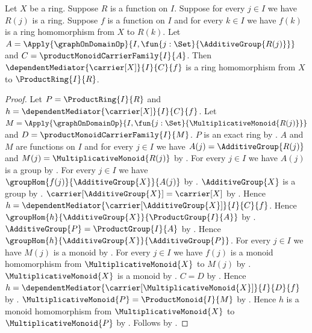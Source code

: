 \begin{theorem}\label{product_ring_mediator_hom}
    Let $X$ be a ring.
    Suppose $R$ is a function on $I$.
    Suppose for every $j\in I$ we have $R(j)$ is a ring.
    Suppose $f$ is a function on $I$ and for every $k\in I$ we have
        $f(k)$ is a ring homomorphism from $X$ to $R(k)$.
    Let
        $A=\Apply{\graphOnDomainOp}{
            I,\fun{j:\Set}{\AdditiveGroup{R(j)}}}$ and
        $C=\productMonoidCarrierFamily{I}{A}$.
    Then $\dependentMediator{\carrier[X]}{I}{C}{f}$ is a ring
        homomorphism from $X$ to $\ProductRing{I}{R}$.
\end{theorem}
\begin{proof}
    Let $P=\ProductRing{I}{R}$ and
        $h=\dependentMediator{\carrier[X]}{I}{C}{f}$.
    Let $M=\Apply{\graphOnDomainOp}{
        I,\fun{j:\Set}{\MultiplicativeMonoid{R(j)}}}$ and
        $D=\productMonoidCarrierFamily{I}{M}$.
    $P$ is an exact ring by .
    $A$ and $M$ are functions on $I$ and for every $j\in I$ we have
        $A(j)=\AdditiveGroup{R(j)}$ and
        $M(j)=\MultiplicativeMonoid{R(j)}$ by
        .
    For every $j\in I$ we have $A(j)$ is a group by
        .
    For every $j\in I$ we have
        $\groupHom{f(j)}{\AdditiveGroup{X}}{A(j)}$ by
        .
    $\AdditiveGroup{X}$ is a group by
        .
    $\carrier[\AdditiveGroup{X}]=\carrier[X]$ by
        .
    Hence $h=\dependentMediator{\carrier[\AdditiveGroup{X}]}{
        I}{C}{f}$.
    Hence $\groupHom{h}{\AdditiveGroup{X}}{\ProductGroup{I}{A}}$ by
        .
    $\AdditiveGroup{P}=\ProductGroup{I}{A}$ by
        .
    Hence $\groupHom{h}{\AdditiveGroup{X}}{\AdditiveGroup{P}}$.
    For every $j\in I$ we have $M(j)$ is a monoid by
        .
    For every $j\in I$ we have $f(j)$ is a monoid homomorphism from
        $\MultiplicativeMonoid{X}$ to $M(j)$ by
        .
    $\MultiplicativeMonoid{X}$ is a monoid by
        .
    $C=D$ by .
    Hence $h=\dependentMediator{\carrier[\MultiplicativeMonoid{X}]}{
        I}{D}{f}$ by
        .
    $\MultiplicativeMonoid{P}=\ProductMonoid{I}{M}$ by
        .
    Hence $h$ is a monoid homomorphism from
        $\MultiplicativeMonoid{X}$ to $\MultiplicativeMonoid{P}$ by
        .
    Follows by .
\end{proof}

